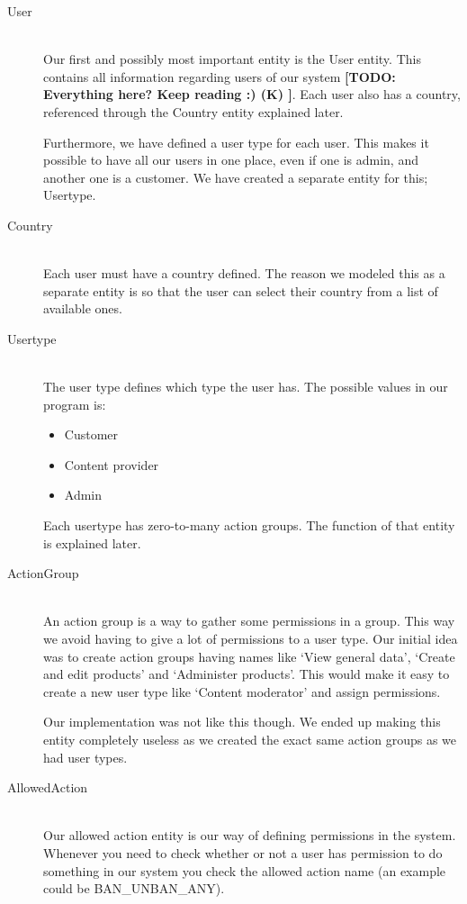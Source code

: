 \begin{description}
\item[User] \hfill \\
Our first and possibly most important entity is the User entity. This contains all information regarding users of our system \textbf{[TODO: Everything here? Keep reading :) (K) ]}. Each user also has a country, referenced through the Country entity explained later.

Furthermore, we have defined a user type for each user. This makes it possible to have all our users in one place, even if one is admin, and another one is a customer. We have created a separate entity for this; Usertype.

\item[Country] \hfill \\
Each user must have a country defined. The reason we modeled this as a separate entity is so that the user can select their country from a list of available ones.

\item[Usertype] \hfill \\
The user type defines which type the user has. The possible values in our program is:
\begin{itemize}
	\item Customer
	\item Content provider
	\item Admin
\end{itemize}

Each usertype has zero-to-many action groups. The function of that entity is explained later.

\item[ActionGroup] \hfill \\
An action group is a way to gather some permissions in a group. This way we avoid having to give a lot of permissions to a user type. Our initial idea was to create action groups having names like `View general data', `Create and edit products' and `Administer products'. This would make it easy to create a new user type like `Content moderator' and assign permissions.

Our implementation was not like this though. We ended up making this entity completely useless as we created the exact same action groups as we had user types.

\item[AllowedAction] \hfill \\
Our allowed action entity is our way of defining permissions in the system. Whenever you need to check whether or not a user has permission to do something in our system you check the allowed action name (an example could be BAN\_UNBAN\_ANY).


\end{description}
